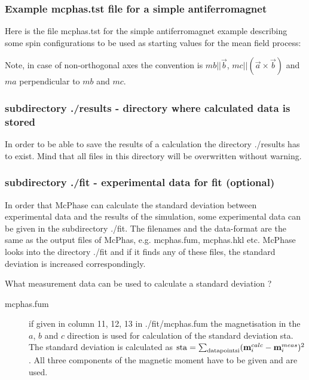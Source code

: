 \subsubsection{Example {\prg mcphas.tst} file  for a simple antiferromagnet}

Here is the file {\prg mcphas.tst} for the simple antiferromagnet example
describing some spin configurations
to be used as starting values for the mean field process:


Note, in case of non-orthogonal axes the convention 
is $mb||\vec b$, $mc||(\vec a \times \vec b)$ and $ma$ perpendicular to $mb$ and $mc$.

\subsubsection{subdirectory {\prg ./results} - directory where calculated data is stored}

In order to be able to save the results of a calculation the directory {\prg ./results} has to
exist. Mind that all files in this directory will be overwritten without warning. 

\subsubsection{subdirectory {\prg ./fit} - experimental data for fit (optional) } 

In order that {\prg McPhase} can calculate the standard deviation between
 experimental data and the results of the simulation, some experimental data
 can be given in the subdirectory {\prg ./fit}. The filenames and the data-format
 are the same as the output files of {\prg McPhas}, e.g. {\prg mcphas.fum}, {\prg mcphas.hkl}
 etc. {\prg McPhase} looks into the directory {\prg ./fit} and if it finds any
 of these files, the standard deviation is increased correspondingly. 

What measurement data can be used to calculate a standard deviation ?

\begin{description}
\item[{\prg mcphas.fum}] if given in column 11, 12, 13 in {\prg ./fit/mcphas.fum} the
            magnetisation in the $a$, $b$ and $c$ direction is used for calculation
	    of the standard deviation sta. The standard deviation is calculated
	    as ${\rm sta}=\sum_{\rm data points i} ({\mathbf m}_i^{calc}-{\mathbf m}_i^{meas})^2$.
	    All three components of the magnetic moment have to be given and are used.

\end{description}

